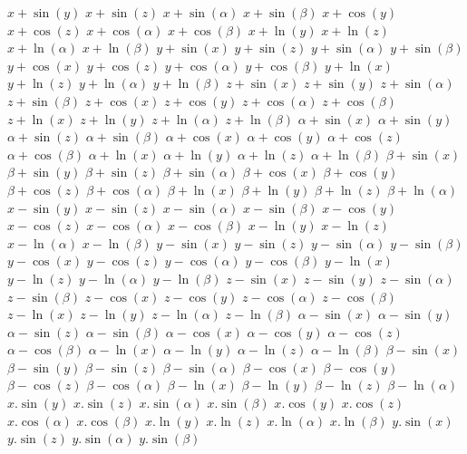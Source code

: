 $ x + \sin(y) $
$ x + \sin(z) $
$ x + \sin(\alpha) $
$ x + \sin(\beta) $
$ x + \cos(y) $
$ x + \cos(z) $
$ x + \cos(\alpha) $
$ x + \cos(\beta) $
$ x + \ln(y) $
$ x + \ln(z) $
$ x + \ln(\alpha) $
$ x + \ln(\beta) $
$ y + \sin(x) $
$ y + \sin(z) $
$ y + \sin(\alpha) $
$ y + \sin(\beta) $
$ y + \cos(x) $
$ y + \cos(z) $
$ y + \cos(\alpha) $
$ y + \cos(\beta) $
$ y + \ln(x) $
$ y + \ln(z) $
$ y + \ln(\alpha) $
$ y + \ln(\beta) $
$ z + \sin(x) $
$ z + \sin(y) $
$ z + \sin(\alpha) $
$ z + \sin(\beta) $
$ z + \cos(x) $
$ z + \cos(y) $
$ z + \cos(\alpha) $
$ z + \cos(\beta) $
$ z + \ln(x) $
$ z + \ln(y) $
$ z + \ln(\alpha) $
$ z + \ln(\beta) $
$ \alpha + \sin(x) $
$ \alpha + \sin(y) $
$ \alpha + \sin(z) $
$ \alpha + \sin(\beta) $
$ \alpha + \cos(x) $
$ \alpha + \cos(y) $
$ \alpha + \cos(z) $
$ \alpha + \cos(\beta) $
$ \alpha + \ln(x) $
$ \alpha + \ln(y) $
$ \alpha + \ln(z) $
$ \alpha + \ln(\beta) $
$ \beta + \sin(x) $
$ \beta + \sin(y) $
$ \beta + \sin(z) $
$ \beta + \sin(\alpha) $
$ \beta + \cos(x) $
$ \beta + \cos(y) $
$ \beta + \cos(z) $
$ \beta + \cos(\alpha) $
$ \beta + \ln(x) $
$ \beta + \ln(y) $
$ \beta + \ln(z) $
$ \beta + \ln(\alpha) $
$ x - \sin(y) $
$ x - \sin(z) $
$ x - \sin(\alpha) $
$ x - \sin(\beta) $
$ x - \cos(y) $
$ x - \cos(z) $
$ x - \cos(\alpha) $
$ x - \cos(\beta) $
$ x - \ln(y) $
$ x - \ln(z) $
$ x - \ln(\alpha) $
$ x - \ln(\beta) $
$ y - \sin(x) $
$ y - \sin(z) $
$ y - \sin(\alpha) $
$ y - \sin(\beta) $
$ y - \cos(x) $
$ y - \cos(z) $
$ y - \cos(\alpha) $
$ y - \cos(\beta) $
$ y - \ln(x) $
$ y - \ln(z) $
$ y - \ln(\alpha) $
$ y - \ln(\beta) $
$ z - \sin(x) $
$ z - \sin(y) $
$ z - \sin(\alpha) $
$ z - \sin(\beta) $
$ z - \cos(x) $
$ z - \cos(y) $
$ z - \cos(\alpha) $
$ z - \cos(\beta) $
$ z - \ln(x) $
$ z - \ln(y) $
$ z - \ln(\alpha) $
$ z - \ln(\beta) $
$ \alpha - \sin(x) $
$ \alpha - \sin(y) $
$ \alpha - \sin(z) $
$ \alpha - \sin(\beta) $
$ \alpha - \cos(x) $
$ \alpha - \cos(y) $
$ \alpha - \cos(z) $
$ \alpha - \cos(\beta) $
$ \alpha - \ln(x) $
$ \alpha - \ln(y) $
$ \alpha - \ln(z) $
$ \alpha - \ln(\beta) $
$ \beta - \sin(x) $
$ \beta - \sin(y) $
$ \beta - \sin(z) $
$ \beta - \sin(\alpha) $
$ \beta - \cos(x) $
$ \beta - \cos(y) $
$ \beta - \cos(z) $
$ \beta - \cos(\alpha) $
$ \beta - \ln(x) $
$ \beta - \ln(y) $
$ \beta - \ln(z) $
$ \beta - \ln(\alpha) $
$ x . \sin(y) $
$ x . \sin(z) $
$ x . \sin(\alpha) $
$ x . \sin(\beta) $
$ x . \cos(y) $
$ x . \cos(z) $
$ x . \cos(\alpha) $
$ x . \cos(\beta) $
$ x . \ln(y) $
$ x . \ln(z) $
$ x . \ln(\alpha) $
$ x . \ln(\beta) $
$ y . \sin(x) $
$ y . \sin(z) $
$ y . \sin(\alpha) $
$ y . \sin(\beta) $
